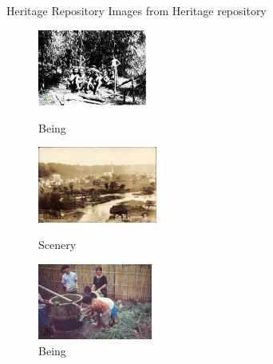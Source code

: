 \documentclass[12pt]{beamer}
\begin{document}
\begin{frame}{Heritage Repository}
Images from Heritage repository
\begin{figure}[!htb]
\captionsetup[subfigure]{labelformat=empty}

\begin{minipage}{0.25\linewidth}
  \includegraphics[height=2.5cm]{images/sample/being_6}\hfill
  \caption*{Being}
\end{minipage}
\hfill
\begin{minipage}{0.30\linewidth}
  \includegraphics[height=2.5cm]{images/sample/scenery_111}\hfill
  \caption*{Scenery}
\end{minipage}%
\hfill
\begin{minipage}{0.31\linewidth}
  \includegraphics[height=2.5cm]{images/sample/being_45}%
  \caption*{Being}
\end{minipage}%
\par


\end{figure}
\end{frame}
\end{document}
